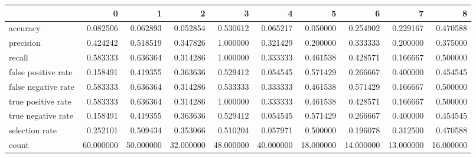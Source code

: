 \begin{tabular}{lrrrrrrrrr}
\toprule
{} &          0 &          1 &          2 &          3 &          4 &          5 &          6 &          7 &          8 \\
\midrule
accuracy            &   0.082506 &   0.062893 &   0.052854 &   0.530612 &   0.065217 &   0.050000 &   0.254902 &   0.229167 &   0.470588 \\
precision           &   0.424242 &   0.518519 &   0.347826 &   1.000000 &   0.321429 &   0.200000 &   0.333333 &   0.200000 &   0.375000 \\
recall              &   0.583333 &   0.636364 &   0.314286 &   1.000000 &   0.333333 &   0.461538 &   0.428571 &   0.166667 &   0.500000 \\
false positive rate &   0.158491 &   0.419355 &   0.363636 &   0.529412 &   0.054545 &   0.571429 &   0.266667 &   0.400000 &   0.454545 \\
false negative rate &   0.583333 &   0.636364 &   0.314286 &   0.533333 &   0.333333 &   0.461538 &   0.571429 &   0.166667 &   0.500000 \\
true positive rate  &   0.583333 &   0.636364 &   0.314286 &   1.000000 &   0.333333 &   0.461538 &   0.428571 &   0.166667 &   0.500000 \\
true negative rate  &   0.158491 &   0.419355 &   0.363636 &   0.529412 &   0.054545 &   0.571429 &   0.266667 &   0.400000 &   0.454545 \\
selection rate      &   0.252101 &   0.509434 &   0.353066 &   0.510204 &   0.057971 &   0.500000 &   0.196078 &   0.312500 &   0.470588 \\
count               &  60.000000 &  50.000000 &  32.000000 &  48.000000 &  40.000000 &  18.000000 &  14.000000 &  13.000000 &  16.000000 \\
\bottomrule
\end{tabular}
